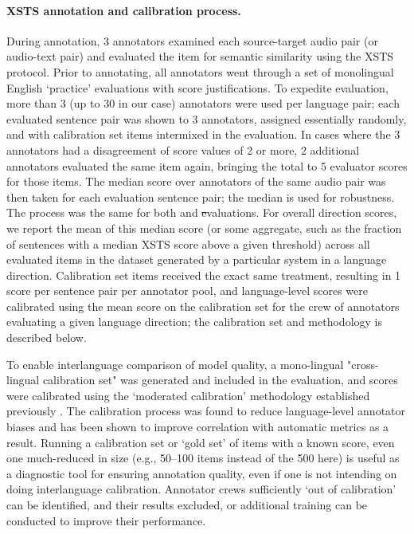 \paragraph{XSTS annotation and calibration process.} During annotation, 3 annotators examined each source-target audio pair (or audio-text pair) and evaluated the item for semantic similarity using the XSTS protocol. Prior to annotating, all annotators went through a set of monolingual English `practice' evaluations with score justifications.  To expedite evaluation, more than 3 (up to 30 in our case) annotators were used per language pair; each evaluated sentence pair was shown to 3 annotators, assigned essentially randomly, and with calibration set items intermixed in the evaluation. In cases where the 3 annotators had a disagreement of score values of 2 or more, 2 additional annotators evaluated the same item again, bringing the total to 5 evaluator scores for those items. The median score over annotators of the same audio pair was then taken for each evaluation sentence pair; the median is used for robustness.  The process was the same for both \sst and \st evaluations. For overall direction scores, we report the mean of this median score (or some aggregate, such as the fraction of sentences with a median XSTS score above a given threshold) across all evaluated items in the dataset generated by a particular system in a language direction. Calibration set items received the exact same treatment, resulting in 1 score per sentence pair per annotator pool, and language-level scores were calibrated using the mean score on the calibration set for the crew of annotators evaluating a given language direction; the calibration set and methodology is described below.

To enable interlanguage comparison of model quality, a mono-lingual "cross-lingual calibration set" \citep{licht2022xsts} was generated and included in the evaluation, and scores were calibrated using the `moderated calibration' methodology established previously \citep{licht2022xsts,nllb2022}.  The calibration process was found to reduce language-level annotator biases and has been shown to improve correlation with automatic metrics as a result. %
Running a calibration set or `gold set' of items with a known score, even one much-reduced in size (e.g., 50–100 items instead of the 500 here) is useful as a diagnostic tool for ensuring annotation quality, even if one is not intending on doing interlanguage calibration.  Annotator crews sufficiently `out of calibration' can be identified, and their results excluded, or additional training can be conducted to improve their performance.  

